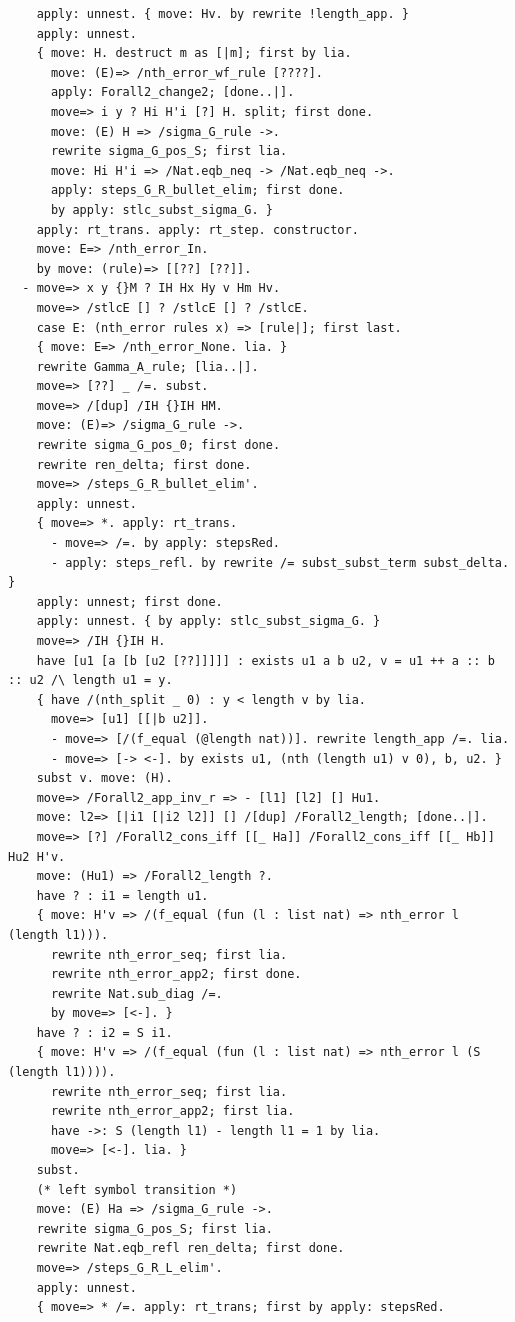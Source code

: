 \documentclass[10pt,a4paper]{amsart}
\begin{document}
\begin{lstlisting}
    apply: unnest. { move: Hv. by rewrite !length_app. }
    apply: unnest.
    { move: H. destruct m as [|m]; first by lia.
      move: (E)=> /nth_error_wf_rule [????].
      apply: Forall2_change2; [done..|].
      move=> i y ? Hi H'i [?] H. split; first done.
      move: (E) H => /sigma_G_rule ->.
      rewrite sigma_G_pos_S; first lia.
      move: Hi H'i => /Nat.eqb_neq -> /Nat.eqb_neq ->.
      apply: steps_G_R_bullet_elim; first done.
      by apply: stlc_subst_sigma_G. }
    apply: rt_trans. apply: rt_step. constructor.
    move: E=> /nth_error_In.
    by move: (rule)=> [[??] [??]].
  - move=> x y {}M ? IH Hx Hy v Hm Hv.
    move=> /stlcE [] ? /stlcE [] ? /stlcE.
    case E: (nth_error rules x) => [rule|]; first last.
    { move: E=> /nth_error_None. lia. }
    rewrite Gamma_A_rule; [lia..|].
    move=> [??] _ /=. subst.
    move=> /[dup] /IH {}IH HM.
    move: (E)=> /sigma_G_rule ->.
    rewrite sigma_G_pos_0; first done.
    rewrite ren_delta; first done.
    move=> /steps_G_R_bullet_elim'.
    apply: unnest.
    { move=> *. apply: rt_trans.
      - move=> /=. by apply: stepsRed.
      - apply: steps_refl. by rewrite /= subst_subst_term subst_delta. }
    apply: unnest; first done.
    apply: unnest. { by apply: stlc_subst_sigma_G. }
    move=> /IH {}IH H.
    have [u1 [a [b [u2 [??]]]]] : exists u1 a b u2, v = u1 ++ a :: b :: u2 /\ length u1 = y.
    { have /(nth_split _ 0) : y < length v by lia.
      move=> [u1] [[|b u2]].
      - move=> [/(f_equal (@length nat))]. rewrite length_app /=. lia.
      - move=> [-> <-]. by exists u1, (nth (length u1) v 0), b, u2. }
    subst v. move: (H). 
    move=> /Forall2_app_inv_r => - [l1] [l2] [] Hu1.
    move: l2=> [|i1 [|i2 l2]] [] /[dup] /Forall2_length; [done..|].
    move=> [?] /Forall2_cons_iff [[_ Ha]] /Forall2_cons_iff [[_ Hb]] Hu2 H'v.
    move: (Hu1) => /Forall2_length ?.
    have ? : i1 = length u1.
    { move: H'v => /(f_equal (fun (l : list nat) => nth_error l (length l1))).
      rewrite nth_error_seq; first lia.
      rewrite nth_error_app2; first done.
      rewrite Nat.sub_diag /=.
      by move=> [<-]. }
    have ? : i2 = S i1.
    { move: H'v => /(f_equal (fun (l : list nat) => nth_error l (S (length l1)))).
      rewrite nth_error_seq; first lia.
      rewrite nth_error_app2; first lia.
      have ->: S (length l1) - length l1 = 1 by lia.
      move=> [<-]. lia. }
    subst.
    (* left symbol transition *)
    move: (E) Ha => /sigma_G_rule ->.
    rewrite sigma_G_pos_S; first lia.
    rewrite Nat.eqb_refl ren_delta; first done.
    move=> /steps_G_R_L_elim'.
    apply: unnest.
    { move=> * /=. apply: rt_trans; first by apply: stepsRed.

\end{lstlisting}
\end{document}
